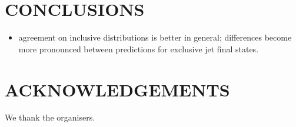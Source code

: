 \section{CONCLUSIONS}
\label{sec:hjetscomp:conclusions}


\begin{itemize}
\item agreement on inclusive distributions is better in general;
  differences become more pronounced between predictions for exclusive
  jet final states. 
\end{itemize}


\section*{ACKNOWLEDGEMENTS}

We thank the organisers.
